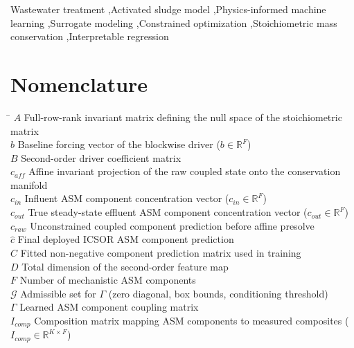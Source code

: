 \documentclass[a4paper,fleqn]{cas-sc}
\newcommand{\rev}[1]{\textcolor{revDefault}{#1}}
\newcommand{\revitem}[2]{\textcolor{#1}{#2}}
\newenvironment{revblockr110}{\begingroup\color{revRoneTen}}{\endgroup}
\begin{document}
\begin{keywords}
\rev{Wastewater treatment \sep Activated sludge model \sep Physics-informed machine learning \sep Surrogate modeling \sep Constrained optimization \sep Stoichiometric mass conservation \sep Interpretable regression}
\end{keywords}

\maketitle

\section*{\revitem{revRoneTen}{Nomenclature}}
\begin{revblockr110}
\begin{tabbing}
\hspace{2.5cm} \= \kill
$A$ \> Full-row-rank invariant matrix defining the null space of the stoichiometric matrix \\
$b$ \> Baseline forcing vector of the blockwise driver ($b \in \mathbb{R}^{F}$) \\
$B$ \> Second-order driver coefficient matrix \\
$c_{aff}$ \> Affine invariant projection of the raw coupled state onto the conservation manifold \\
$c_{in}$ \> Influent ASM component concentration vector ($c_{in} \in \mathbb{R}^{F}$) \\
$c_{out}$ \> True steady-state effluent ASM component concentration vector ($c_{out} \in \mathbb{R}^{F}$) \\
$c_{raw}$ \> Unconstrained coupled component prediction before affine presolve \\
$\hat{c}$ \> Final deployed ICSOR ASM component prediction \\
$\widehat{C}$ \> Fitted non-negative component prediction matrix used in training \\
$D$ \> Total dimension of the second-order feature map \\
$F$ \> Number of mechanistic ASM components \\
$\mathcal{G}$ \> Admissible set for $\Gamma$ (zero diagonal, box bounds, conditioning threshold) \\
$\Gamma$ \> Learned ASM component coupling matrix \\
$I_{comp}$ \> Composition matrix mapping ASM components to measured composites ($I_{comp} \in \mathbb{R}^{K \times F}$) \\

\end{tabbing}
\end{revblockr110}
\end{document}
